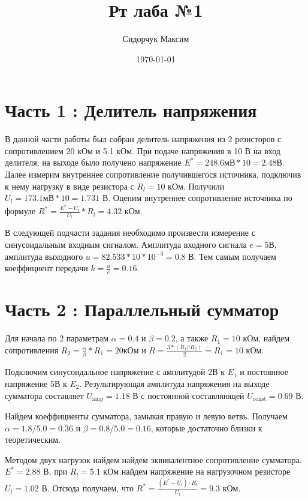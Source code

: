 \documentclass[a4paper]{article}
\date{\today}
\title{Рт лаба №1}
\author{Сидорчук Максим}
\begin{document}
\maketitle

\section{Часть 1 : Делитель напряжения}

В данной части работы был собран делитель напряжения из 2 резисторов с сопротивлением 20 кОм и 5.1 кОм.
При подаче напряжения в 10 В на вход делителя, на выходе было получено напряжение \(E^* = 248.6 \text {мВ} * 10 = 2.48 \text {В}\).
Далее измерим внутреннее сопротивление получившегося источника, подключив к нему нагрузку
в виде резистора с \(R_l = 10\) кОм. Получили \(U_l = 173.1 \text{мВ} * 10 = 1.731\) В. Оценим
внутреннее сопротивление источника по формуле \(R^* = \frac{E^* - U_l}{U_l} * R_l = 4.32\) кОм.

В следующей подчасти задания необходимо произвести измерение с синусоидальным входным сигналом.
Амплитуда входного сигнала \(e = 5\)В, амплитуда выходного \(u = 82.533 * 10 * 10^{-3} = 0.8\) В.
Тем самым получаем коеффициент передачи \(k = \frac{u}{e} = 0.16\).

\section{Часть 2 : Параллельный сумматор}

Для начала по 2 параметрам \(\alpha = 0.4\) и \(\beta = 0.2\), а также \(R_1 = 10\) кОм,
найдем сопротивления \(R_2 = \frac{\alpha}{\beta} * R_1 = 20 \text{кОм и } R = \frac{3 * (R_1 || R_2)}{2} = R_1 = 10\) кОм.

Подключим синусоидальное напряжение с амплитудой 2В к $E_1$ и постоянное напряжение 5В к $E_2$. Результирующая амплитуда
напряжения на выходе сумматора составляет $U_\text{amp} = 1.18$ В с постоянной составляющей $U_\text{const} = 0.69$ В.

Найдем коеффициенты сумматора, замыкая правую и левую ветвь. Получаем $\alpha = 1.8 / 5.0 = 0.36$ и $\beta = 0.8 / 5.0 = 0.16$, которые достаточно близки к теоретическим.

Методом двух нагрузок найдем найдем эквивалентное сопротивление сумматора. $E^* = 2.88$ В, при $R_l = 5.1$ кОм найдем напряжение на нагрузочном резисторе $U_l = 1.02$ В.
Отсюда получаем, что $R^* = \frac{(E^* - U_l) \cdot R_l}{U_l} = 9.3$ кОм.
\end{document}
